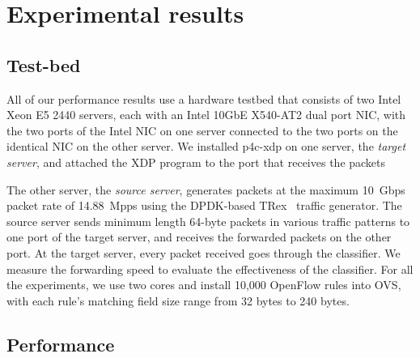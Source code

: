 \section{Experimental results}\label{sec:results}
\subsection{Test-bed}
All of our performance results use a hardware testbed that consists of
two Intel Xeon E5 2440 servers, each with an Intel 10GbE X540-AT2 dual
port NIC, with the two ports of the Intel NIC on one server connected
to the two ports on the identical NIC on the other server.  We
installed p4c-xdp on one server, the {\em target server}, and
attached the XDP program to the port that receives the packets

The other server, the {\em source server}, generates packets
at the maximum 10~Gbps packet rate of 14.88~Mpps using the DPDK-based
TRex~\cite{trex} traffic generator.  The source server sends minimum
length 64-byte packets in various traffic patterns to one port of the
target server, and receives the forwarded packets on the other port.
At the target server, every packet received goes through the
classifier.  We measure the forwarding speed to evaluate the
effectiveness of the classifier.  For all the experiments, we use two
cores and install 10,000 OpenFlow rules into OVS, with each rule's
matching field size range from 32 bytes to 240 bytes.

\subsection{Performance}

